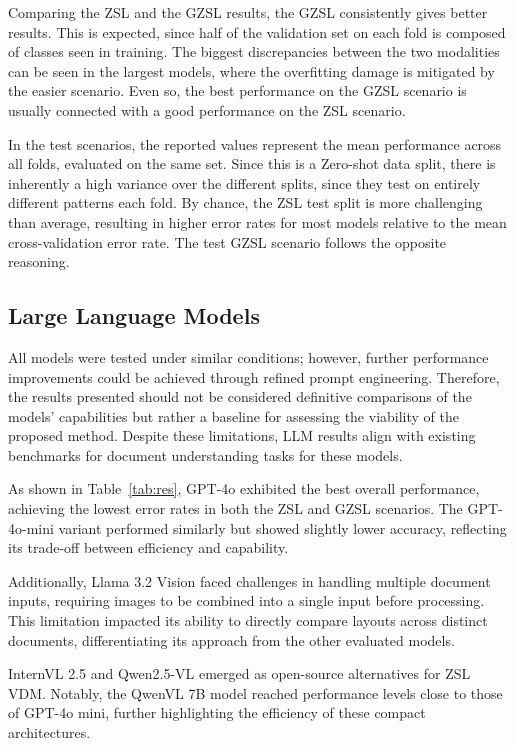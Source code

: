 Comparing the \gls{ZSL} and the \gls{GZSL} results, the \gls{GZSL} consistently gives better results. This is expected, since half of the validation set on each fold is composed of classes seen in training. The biggest discrepancies between the two modalities can be seen in the largest models, where the overfitting damage is mitigated by the easier scenario. Even so, the best performance on the \gls{GZSL} scenario is usually connected with a good performance on the \gls{ZSL} scenario.

In the test scenarios, the reported values represent the mean performance across all folds, evaluated on the same set. Since this is a Zero-shot data split, there is inherently a high variance over the different splits, since they test on entirely different patterns each fold. By chance, the \gls{ZSL} test split is more challenging than average, resulting in higher error rates for most models relative to the mean cross-validation error rate. The test \gls{GZSL} scenario follows the opposite reasoning.

\subsection{Large Language Models}
\label{sec:llm_result}

All models were tested under similar conditions; however, further performance improvements could be achieved through refined prompt engineering. Therefore, the results presented should not be considered definitive comparisons of the models' capabilities but rather a baseline for assessing the viability of the proposed method. Despite these limitations, \gls{LLM} results align with existing benchmarks for document understanding tasks for these models. 

As shown in Table~\ref{tab:res}, GPT-4o exhibited the best overall performance, achieving the lowest error rates in both the \gls{ZSL} and \gls{GZSL} scenarios. The GPT-4o-mini variant performed similarly but showed slightly lower accuracy, reflecting its trade-off between efficiency and capability.

Additionally, Llama 3.2 Vision faced challenges in handling multiple document inputs, requiring images to be combined into a single input before processing. This limitation impacted its ability to directly compare layouts across distinct documents, differentiating its approach from the other evaluated models.

InternVL 2.5 and Qwen2.5-VL emerged as open-source alternatives for \gls{ZSL} \gls{VDM}. Notably, the QwenVL 7B model reached performance levels close to those of GPT-4o mini, further highlighting the efficiency of these compact architectures.

